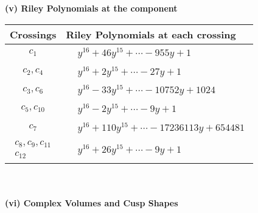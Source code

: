 \documentclass[1p]{elsarticle_modified}
\theoremstyle{definition}
\begin{document}
\newpage\renewcommand{\arraystretch}{1}
\flushleft \textbf{(v) Riley Polynomials at the component}\newline \\
\begin{tabular}{m{50pt}|m{274pt}}
Crossings & \hspace{64pt}Riley Polynomials at each crossing \\
\hline $$\begin{aligned}c_{1}\end{aligned}$$&$\begin{aligned}
&y^{16}+46 y^{15}+\cdots-955 y+1
\end{aligned}$\\
\hline $$\begin{aligned}c_{2},c_{4}\end{aligned}$$&$\begin{aligned}
&y^{16}+2 y^{15}+\cdots-27 y+1
\end{aligned}$\\
\hline $$\begin{aligned}c_{3},c_{6}\end{aligned}$$&$\begin{aligned}
&y^{16}-33 y^{15}+\cdots-10752 y+1024
\end{aligned}$\\
\hline $$\begin{aligned}c_{5},c_{10}\end{aligned}$$&$\begin{aligned}
&y^{16}-2 y^{15}+\cdots-9 y+1
\end{aligned}$\\
\hline $$\begin{aligned}c_{7}\end{aligned}$$&$\begin{aligned}
&y^{16}+110 y^{15}+\cdots-17236113 y+654481
\end{aligned}$\\
\hline $$\begin{aligned}c_{8},c_{9},c_{11}\\c_{12}\end{aligned}$$&$\begin{aligned}
&y^{16}+26 y^{15}+\cdots-9 y+1
\end{aligned}$\\
\hline
\end{tabular}\\~\\
\newpage\flushleft \textbf{(vi) Complex Volumes and Cusp Shapes}
\end{document}
